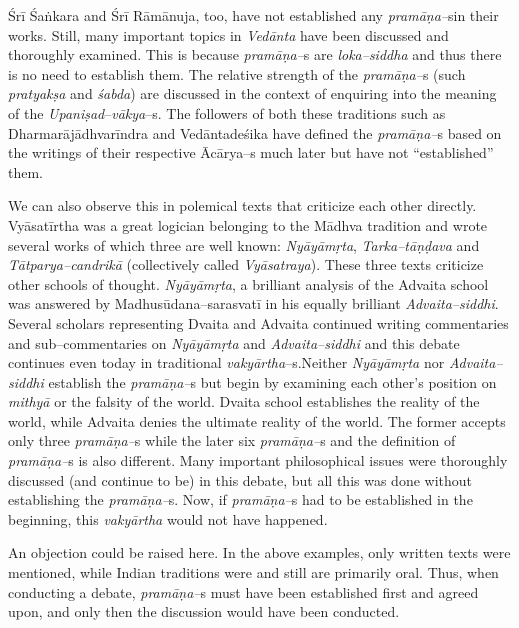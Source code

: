 Śrī Śaṅkara and Śrī Rāmānuja, too, have not established any \textit{pramāṇa–}s\break in their works. Still, many important topics in \textit{Vedānta} have been discussed and thoroughly examined. This is because \textit{pramāṇa–}s are \textit{loka–siddha} and thus there is no need to establish them. The relative strength of the \textit{pramāṇa–}s (such \textit{pratyakṣa} and \textit{śabda}) are discussed in the context of enquiring into the meaning of the \textit{Upaniṣad}–\textit{vākya}–s. The followers of both these traditions such as Dharmarājādhvarīndra and Vedāntadeśika have defined the \textit{pramāṇa–}s based on the writings of their respective Ācārya–s much later but have not “established” them.

We can also observe this in polemical texts that criticize each other directly. Vyāsatīrtha was a great logician belonging to the Mādhva tradition and wrote several works of which three are well known: \textit{Nyāyāmṛta}, \textit{Tarka–tāṇḍava} and \textit{Tātparya–candrikā} (collectively called \textit{Vyāsatraya}). These three texts criticize other schools of thought. \textit{Nyāyāmṛta}, a brilliant analysis of the Advaita school was answered by Madhusūdana–sarasvatī in his equally brilliant \textit{Advaita–siddhi}. Several scholars representing Dvaita and Advaita continued writing commentaries and sub–commentaries on \textit{Nyāyāmṛta} and \textit{Advaita–siddhi} and this debate continues even today in traditional \textit{vakyārtha}–s.\break Neither \textit{Nyāyāmṛta} nor \textit{Advaita–siddhi} establish the \textit{pramāṇa–}s but begin by examining each other’s position on \textit{mithyā} or the falsity of the world. Dvaita school establishes the reality of the world, while Advaita denies the ultimate reality of the world. The former accepts only three \textit{pramāṇa–}s while the later six \textit{pramāṇa–}s and the definition of \textit{pramāṇa–}s is also different. Many important philosophical issues were thoroughly discussed (and continue to be) in this debate, but all this was done without establishing the \textit{pramāṇa–}s. Now, if \textit{pramāṇa–}s had to be established in the beginning, this \textit{vakyārtha} would not have happened.

An objection could be raised here. In the above examples, only written texts were mentioned, while Indian traditions were and still are primarily oral. Thus, when conducting a debate, \textit{pramāṇa–}s must have been established first and agreed upon, and only then the discussion would have been conducted.

